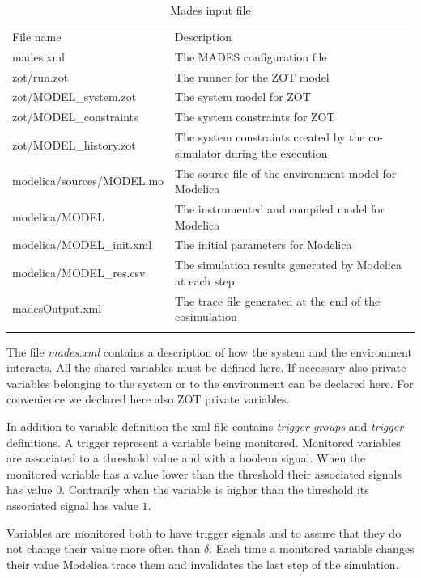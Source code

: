 \documentclass{kapproc} %
\begin{document}
\begin{table}[h]
\caption{Mades input file}
\label{table:input-files}
\centering
\begin{tabular}{ l | l }
\sphline
File name &Description\\
\sphline
\sphline
mades.xml&The MADES configuration file\\
\sphline
zot/run.zot&The runner for the ZOT model\\
\sphline
zot/MODEL\_system.zot&The system model for ZOT\\
\sphline
zot/MODEL\_constraints&The system constraints for ZOT\\
\sphline
zot/MODEL\_history.zot&The system constraints created by the co-simulator during the execution\\
\sphline
modelica/sources/MODEL.mo&The source file of the environment model for Modelica\\
\sphline
modelica/MODEL&The instrumented and compiled model for Modelica\\
\sphline
modelica/MODEL\_init.xml&The initial parameters for Modelica\\
\sphline
modelica/MODEL\_res.csv&The simulation results generated by Modelica at each step\\
\sphline
madesOutput.xml&The trace file generated at the end of the cosimulation\\
\sphline
\end{tabular}
\end{table}

The file \emph{mades.xml} contains a description of how the system and the 
environment interacts.  All the shared variables must be defined here. If necessary also private variables belonging to the system or to the environment can be declared here. For convenience we declared here also ZOT private variables.

In addition to variable definition the xml file contains \emph{trigger groups} and \emph{trigger} definitions. A trigger represent a variable being monitored. Monitored variables are associated to a threshold value and with a boolean signal.
When the monitored variable has a value lower than the threshold their associated signals has value $0$. Contrarily when the variable is higher than the threshold its associated signal has value $1$.

Variables are monitored both to have trigger signals and to assure that they do not change their value more often than $\delta$. 
Each time a monitored variable changes their value Modelica trace them and invalidates the last step of the simulation.
\end{document}

